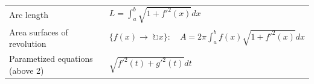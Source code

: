 \documentclass{article}
\begin{document}
\begin{tabular}{|l|l|}
    Arc length                          & $L=\int_{a}^{b}\sqrt{1+f'^2(x)}dx$                                                                                                                                                                                                                                                                   \\
    Area surfaces of revolution         & $\{f(x)\to\ \circlearrowright x\}:\quad A=2\pi\int_{a}^{b}f(x)\sqrt{1+f'^2(x)}dx$                                                                                                                                                                                                                    \\
    Parametized equations (above 2)     & $\sqrt{f'^2(t)+g'^2(t)}dt$                                                                                                                                                                                                                                                                           \\\hline
\end{tabular}
\newpage
\end{document}
